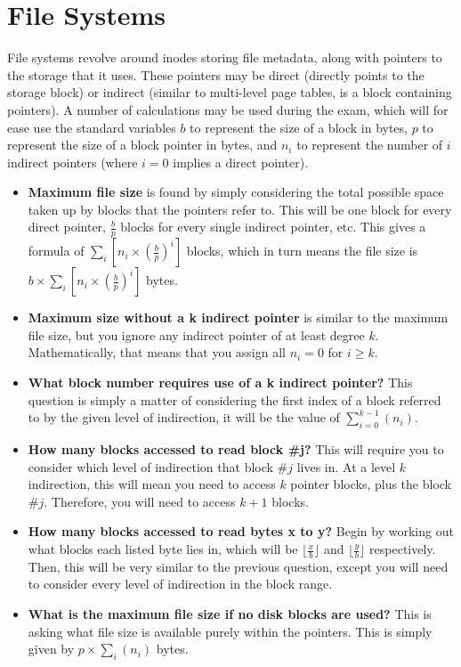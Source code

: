 \documentclass{article}
\begin{document}
\newpage
\section{File Systems}
File systems revolve around inodes storing file metadata, along with pointers to the storage that it uses. These pointers may be direct (directly points to the storage block) or indirect (similar to multi-level page tables, is a block containing pointers). A number of calculations may be used during the exam, which will for ease use the standard variables $b$ to represent the size of a block in bytes, $p$ to represent the size of a block pointer in bytes, and $n_i$ to represent the number of $i$ indirect pointers (where $i=0$ implies a direct pointer).
\begin{itemize}
    \item \textbf{Maximum file size} is found by simply considering the total possible space taken up by blocks that the pointers refer to. This will be one block for every direct pointer, $\frac{b}{p}$ blocks for every single indirect pointer, etc. This gives a formula of $\sum_{i} \left[ n_i \times \left(\frac{b}{p}\right)^i \right]$ blocks, which in turn means the file size is $b\times\sum_{i} \left[ n_i \times \left(\frac{b}{p}\right)^i \right]$ bytes.
    \item \textbf{Maximum size without a k indirect pointer} is similar to the maximum file size, but you ignore any indirect pointer of at least degree $k$. Mathematically, that means that you assign all $n_i = 0$ for $i \ge k$.
    \item \textbf{What block number requires use of a k indirect pointer?} This question is simply a matter of considering the first index of a block referred to by the given level of indirection, it will be the value of $\sum_{i=0}^{k-1} (n_i)$.
    \item \textbf{How many blocks accessed to read block \#j?} This will require you to consider which level of indirection that block \#$j$ lives in. At a level $k$ indirection, this will mean you need to access $k$ pointer blocks, plus the block \#$j$. Therefore, you will need to access $k+1$ blocks.
    \item \textbf{How many blocks accessed to read bytes x to y?} Begin by working out what blocks each listed byte lies in, which will be $\lfloor\frac{x}{b}\rfloor$ and $\lfloor\frac{y}{b}\rfloor$ respectively. Then, this will be very similar to the previous question, except you will need to consider every level of indirection in the block range.
    \item \textbf{What is the maximum file size if no disk blocks are used?} This is asking what file size is available purely within the pointers. This is simply given by $p\times \sum_{i}(n_i)$ bytes.
\end{itemize}
\end{document}
